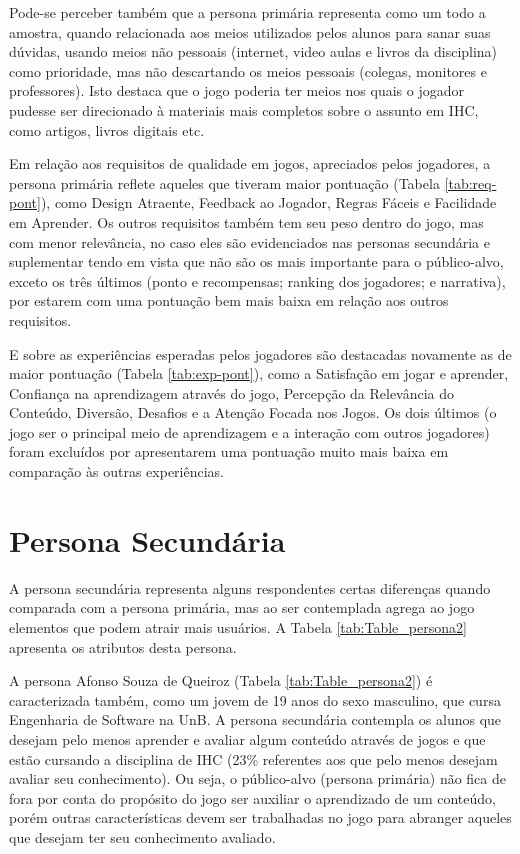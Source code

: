 Pode-se perceber também que a persona primária representa como um todo a amostra, quando relacionada aos meios utilizados pelos alunos para sanar suas dúvidas, usando meios não pessoais (internet, video aulas e livros da disciplina) como prioridade, mas não descartando os meios pessoais (colegas, monitores e professores). Isto destaca que o jogo poderia ter meios nos quais o jogador pudesse ser direcionado à materiais mais completos sobre o assunto em IHC, como artigos, livros digitais etc.

Em relação aos requisitos de qualidade em jogos, apreciados pelos jogadores, a persona primária reflete aqueles que tiveram maior pontuação (Tabela \ref{tab:req-pont}), como Design Atraente, Feedback ao Jogador, Regras Fáceis e Facilidade em Aprender. Os outros requisitos também tem seu peso dentro do jogo, mas com menor relevância, no caso eles são evidenciados nas personas secundária e suplementar tendo em vista que não são os mais importante para o público-alvo, exceto os três últimos (ponto e recompensas; ranking dos jogadores; e narrativa), por estarem com uma pontuação bem mais baixa em relação aos outros requisitos.  

E sobre as experiências esperadas pelos jogadores são destacadas novamente as de maior pontuação (Tabela \ref{tab:exp-pont}), como a Satisfação em jogar e aprender, Confiança na aprendizagem através do jogo, Percepção da Relevância do Conteúdo, Diversão, Desafios e a Atenção Focada nos Jogos. Os dois últimos (o jogo ser o principal meio de aprendizagem e a interação com outros jogadores) foram excluídos por apresentarem uma pontuação muito mais baixa em comparação às outras experiências. 

\section{Persona Secundária}
\label{sec:p2}

A persona secundária representa alguns respondentes certas diferenças quando comparada com a persona primária, mas ao ser contemplada agrega ao jogo elementos que podem atrair mais usuários. A Tabela \ref{tab:Table_persona2} apresenta os atributos desta persona.




A persona Afonso Souza de Queiroz (Tabela \ref{tab:Table_persona2}) é caracterizada também, como um jovem de 19 anos do sexo masculino, que cursa Engenharia de Software na UnB. A persona secundária contempla os alunos que desejam pelo menos aprender e avaliar algum conteúdo através de jogos e que estão cursando a disciplina de IHC (23\% referentes aos que pelo menos desejam avaliar seu conhecimento). Ou seja, o público-alvo (persona primária) não fica de fora por conta do propósito do jogo ser auxiliar o aprendizado de um conteúdo, porém outras características devem ser trabalhadas no jogo para abranger aqueles que desejam ter seu conhecimento avaliado. 

